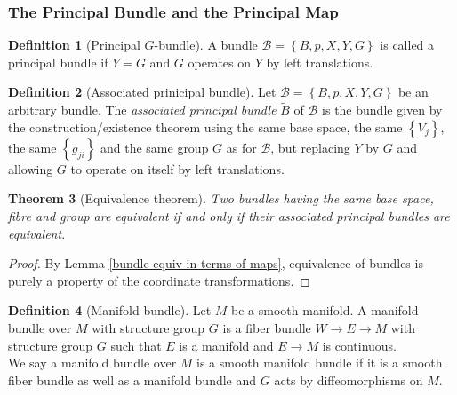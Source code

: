 \documentclass[reqno]{amsart}
\newtheorem{theorem}{Theorem}[section]
\theoremstyle{definition}
\newtheorem{definition}[theorem]{Definition}
\theoremstyle{remark}
\begin{document}
\subsubsection{The Principal Bundle and the Principal Map}

\begin{definition}[Principal $G$-bundle]
    A bundle
    $\mathcal{B} = 
    \left\{ B,p,X,Y,G \right\} $ is called
    a principal bundle if $Y = G$ and
    $G$ operates on $Y $ by left translations.
\end{definition}

\begin{definition}[Associated prinicipal bundle]
    Let $\mathcal{B} = \left\{ B,p,X,Y,G \right\} $ be
    an arbitrary bundle. The
    \textit{associated principal bundle}
    $\tilde{B}$ of $\mathcal{B}$ is the bundle given
    by the construction/existence theorem using the
    same base space, the same $\left\{ V_j \right\} $,
    the same $\left\{ g_{ji} \right\} $ and
    the same group $G$ as for $\mathcal{B}$, but
    replacing $Y$ by $G$ and allowing $G$ to operate
    on itself by left translations.
\end{definition}

\begin{theorem}[Equivalence theorem]\label{Equivalence-theorem}
    Two bundles having the same base space, fibre
    and group are equivalent if and only if their
    associated principal bundles are equivalent.
\end{theorem}

\begin{proof}
    By Lemma \ref{bundle-equiv-in-terms-of-maps}, 
    equivalence of bundles is purely a property
    of the coordinate transformations.
\end{proof}






\newpage
\begin{definition}[Manifold bundle]
    Let $M$ be a smooth manifold. A
    manifold bundle over $M$ with structure group
    $G$ is a fiber
    bundle
    $W \to E \to M$ with
    structure group $G$ such that
    $E$ is a manifold and $E \to M$ is continuous.\\
    We say a manifold bundle over $M$ is a smooth
    manifold bundle if it is
    a smooth fiber bundle as well as
    a manifold bundle and $G$ acts by diffeomorphisms
    on $M$.
\end{definition}
\end{document}
